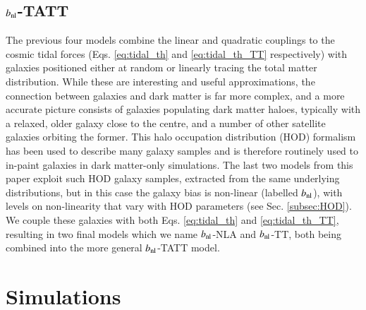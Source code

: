 \documentclass[useAMS,usenatbib]{mn2e}
\begin{document}
\subsection{$b_{\rm nl}$-TATT}
\label{subsec:HOD-TATT}

The previous four models combine the linear and quadratic couplings to the cosmic tidal forces  (Eqs. \ref{eq:tidal_th} and \ref{eq:tidal_th_TT} respectively) with galaxies positioned  either at random or linearly tracing the total matter distribution. While these are interesting and useful approximations, the connection between galaxies and dark matter is far more complex, and a more accurate picture consists of galaxies populating dark matter haloes, typically with a relaxed, older galaxy close to the centre, and a number of other satellite galaxies orbiting the former. This halo occupation distribution (HOD) formalism has been used to describe many galaxy samples \citep[e.g.][]{SDSS-HOD, BOSS-HOD, GAMA-HOD, DESI-HOD} and is therefore routinely used to in-paint galaxies in dark matter-only simulations. The last two models from this paper exploit such HOD galaxy samples, extracted from the same underlying distributions, but in this case the galaxy bias is non-linear (labelled $b_{\rm nl}$), with levels on non-linearity that vary with HOD parameters (see Sec. \ref{subsec:HOD}).  We couple these galaxies with both Eqs. \ref{eq:tidal_th} and \ref{eq:tidal_th_TT}, resulting in two final models which we name  $b_{\rm nl}$-NLA and  $b_{\rm nl}$-TT, both being combined into the more general  $b_{\rm nl}$-TATT model.






\section{Simulations}
\label{sec:sims}
\end{document}
